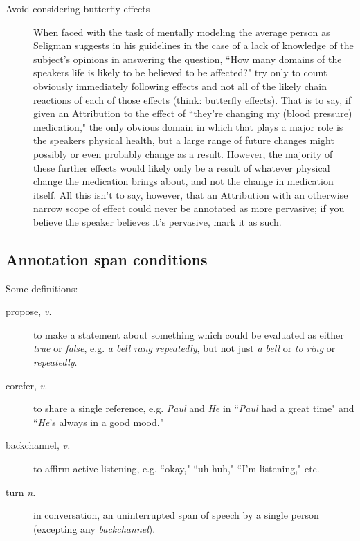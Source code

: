 \documentclass[a4paper,12pt]{article}
\begin{document}
\begin{enumerate}
\begin{description}
                \item[Avoid considering butterfly effects] When faced with the task of mentally modeling the average person as Seligman suggests in his guidelines in the case of a lack of knowledge of the subject's opinions in answering the question, ``How many domains of the speakers life is likely to be believed to be affected?" try only to count obviously immediately following effects and not all of the likely chain reactions of each of those effects (think: butterfly effects). That is to say, if given an Attribution to the effect of ``they're changing my (blood pressure) medication," the only obvious domain in which that plays a major role is the speakers physical health, but a large range of future changes might possibly or even probably change as a result. However, the majority of these further effects would likely only be a result of whatever physical change the medication brings about, and not the change in medication itself. All this isn't to say, however, that an Attribution with an otherwise narrow scope of effect could never be annotated as more pervasive; if you believe the speaker believes it's pervasive, mark it as such.
            \end{description}
        \end{enumerate}

    \newpage
    \subsection{Annotation span conditions} \label{conditions}
        Some definitions:
        \begin{description}
            \item[propose, \emph{v.}] to make a statement about something which could be evaluated as either \emph{true} or \emph{false},
                e.g. \emph{a bell rang repeatedly}, but not just \emph{a bell} or \emph{to ring} or \emph{repeatedly}.
            \item[corefer, \emph{v.}] to share a single reference,
                e.g. \emph{Paul} and \emph{He} in ``\emph{Paul} had a great time" and ``\emph{He}'s always in a good mood."
            \item[backchannel, \emph{v.}] to affirm active listening, e.g. ``okay," ``uh-huh," ``I'm listening," etc.
            \item[turn \emph{n.}] in conversation, an uninterrupted span of speech by a single person (excepting any \emph{backchannel}).
        \end{description}
\end{document}
